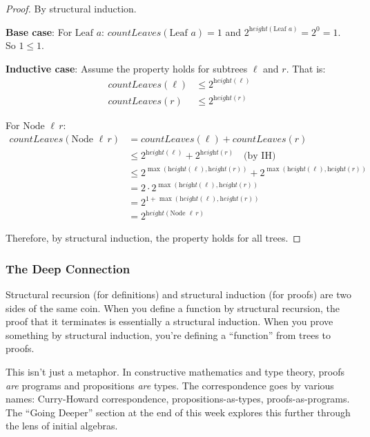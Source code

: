 \begin{proof}
By structural induction.

\textbf{Base case}: For $\text{Leaf } a$: $\textit{countLeaves}(\text{Leaf } a) = 1$ and $2^{\textit{height}(\text{Leaf } a)} = 2^0 = 1$. So $1 \leq 1$. \checkmark

\textbf{Inductive case}: Assume the property holds for subtrees $\ell$ and $r$. That is:
\begin{align*}
\textit{countLeaves}(\ell) &\leq 2^{\textit{height}(\ell)} \\
\textit{countLeaves}(r) &\leq 2^{\textit{height}(r)}
\end{align*}

For $\text{Node } \ell\, r$:
\begin{align*}
\textit{countLeaves}(\text{Node } \ell\, r) &= \textit{countLeaves}(\ell) + \textit{countLeaves}(r) \\
&\leq 2^{\textit{height}(\ell)} + 2^{\textit{height}(r)} \quad \text{(by IH)} \\
&\leq 2^{\max(\textit{height}(\ell), \textit{height}(r))} + 2^{\max(\textit{height}(\ell), \textit{height}(r))} \\
&= 2 \cdot 2^{\max(\textit{height}(\ell), \textit{height}(r))} \\
&= 2^{1 + \max(\textit{height}(\ell), \textit{height}(r))} \\
&= 2^{\textit{height}(\text{Node } \ell\, r)}
\end{align*}

Therefore, by structural induction, the property holds for all trees.
\end{proof}

\subsubsection*{The Deep Connection}

Structural recursion (for definitions) and structural induction (for proofs) are two sides of the same coin. When you define a function by structural recursion, the proof that it terminates is essentially a structural induction. When you prove something by structural induction, you're defining a ``function'' from trees to proofs.

This isn't just a metaphor. In constructive mathematics and type theory, proofs \emph{are} programs and propositions \emph{are} types. The correspondence goes by various names: Curry-Howard correspondence, propositions-as-types, proofs-as-programs. The ``Going Deeper'' section at the end of this week explores this further through the lens of initial algebras.

